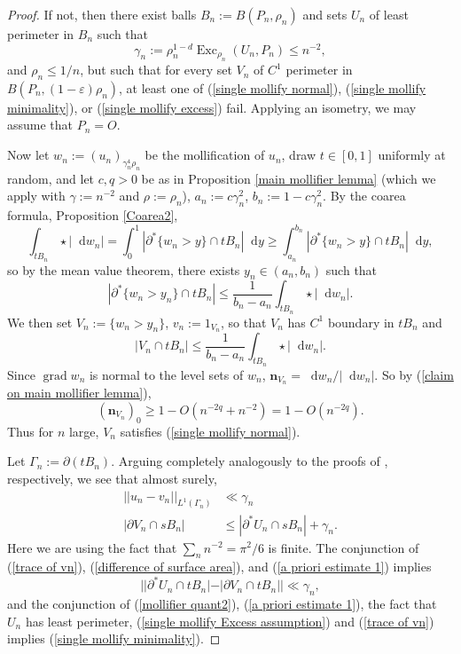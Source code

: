 \documentclass[reqno,11pt]{amsart}
\DeclareMathOperator{\Exc}{Exc}
\newcommand*\dif{\mathop{}\!\mathrm{d}}
\DeclareMathOperator{\grad}{grad}
\newcommand{\normal}{\mathbf n}
\theoremstyle{definition}
\numberwithin{equation}{section}
\begin{document}
\begin{proof}
If not, then there exist balls $B_n := B(P_n, \rho_n)$ and sets $U_n$ of least perimeter in $B_n$ such that
\begin{equation}\label{single mollify Excess assumption}
\gamma_n := \rho_n^{1 - d} \Exc_{\rho_n} (U_n, P_n) \leq n^{-2},
\end{equation}
and $\rho_n \leq 1/n$, but such that for every set $V_n$ of $C^1$ perimeter in $B(P_n, (1 - \varepsilon) \rho_n)$, at least one of (\ref{single mollify normal}), (\ref{single mollify minimality}), or (\ref{single mollify excess}) fail.
Applying an isometry, we may assume that $P_n = O$.

Now let $w_n := (u_n)_{\gamma_n^4 \rho_n}$ be the mollification of $u_n$, draw $t \in [0, 1]$ uniformly at random, and let $c, q > 0$ be as in Proposition \ref{main mollifier lemma} (which we apply with $\gamma := n^{-2}$ and $\rho := \rho_n$), $a_n := c\gamma_n^2$, $b_n := 1 - c\gamma_n^2$.
By the coarea formula, Proposition \ref{Coarea2},
$$\int_{tB_n} \star |\dif w_n| = \int_0^1 |\partial^* \{w_n > y\} \cap tB_n| \dif y \geq \int_{a_n}^{b_n} |\partial^* \{w_n > y\} \cap tB_n| \dif y,$$
so by the mean value theorem, there exists $y_n \in (a_n, b_n)$ such that
$$|\partial^* \{w_n > y_n\} \cap tB_n| \leq \frac{1}{b_n - a_n} \int_{tB_n} \star |\dif w_n|.$$
We then set $V_n := \{w_n > y_n\}$, $v_n := 1_{V_n}$, so that $V_n$ has $C^1$ boundary in $tB_n$ and
\begin{equation}\label{MVT mollifier}
|V_n \cap tB_n| \leq \frac{1}{b_n - a_n} \int_{tB_n} \star |\dif w_n|.
\end{equation}
Since $\grad w_n$ is normal to the level sets of $w_n$, $\normal_{V_n} = \dif w_n/|\dif w_n|$.
So by (\ref{claim on main mollifier lemma}),
$$(\normal_{V_n})_0 \geq 1 - O(n^{-2q} + n^{-2}) = 1 - O(n^{-2q}).$$
Thus for $n$ large, $V_n$ satisfies (\ref{single mollify normal}).

Let $\Gamma_n := \partial(tB_n)$.
Arguing completely analogously to the proofs of \cite[(7.23), (7.22)]{Giusti77}, respectively, we see that almost surely,
\begin{align}
||u_n - v_n||_{L^1(\Gamma_n)} &\ll \gamma_n \label{trace of vn} \\
|\partial V_n \cap sB_n| &\leq |\partial^* U_n \cap sB_n| + \gamma_n. \label{difference of surface area}
\end{align}
Here we are using the fact that $\sum_n n^{-2} = \pi^2/6$ is finite.
The conjunction of (\ref{trace of vn}), (\ref{difference of surface area}), and (\ref{a priori estimate 1}) implies
\begin{equation}
||\partial^* U_n \cap tB_n| - |\partial V_n \cap tB_n|| \ll \gamma_n, \label{mollifier quant2}
\end{equation}
and the conjunction of (\ref{mollifier quant2}), (\ref{a priori estimate 1}), the fact that $U_n$ has least perimeter, (\ref{single mollify Excess assumption}) and (\ref{trace of vn}) implies (\ref{single mollify minimality}).


\end{proof}
\end{document}
